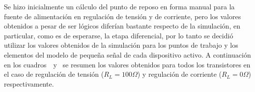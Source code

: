 
Se hizo inicialmente un cálculo del punto de reposo en forma manual para la fuente de alimentación en regulación de tensión y de corriente, pero los valores obtenidos a pesar de ser lógicos diferían bastante respecto de la simulación, en particular, como es de esperarse, la etapa diferencial, por lo tanto se decidió utilizar los valores obtenidos de la simulación para los puntos de trabajo y los elementos del modelo de pequeña señal de cada dispositivo activo.
A continuación en los cuadros~~y~ se resumen los valores obtenidos para todos los transistores en el caso de regulación de tensión ($R_{L}=100 \Omega$) y regulación de corriente ($R_{L}=0 \Omega$) respectivamente.



 
